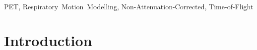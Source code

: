 \documentclass[9pt]{IEEEtran}
\begin{document}
% 



\maketitle




\begin{IEEEkeywords}
PET, Respiratory~Motion~Modelling, Non-Attenuation-Corrected, Time-of-Flight
\end{IEEEkeywords}

\vspace{-0.2cm}

%
\IEEEpeerreviewmaketitle

\section{Introduction}
% 
% 
% 
% 
\end{document}
